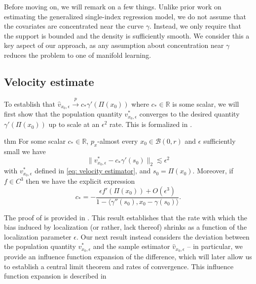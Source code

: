 \documentclass[11pt]{article}
\begin{document}
Before moving on, we will remark on a few things. Unlike prior work on estimating the generalized single-index regression model, we do not assume that the covariates are concentrated near the curve $\gamma$. Instead, we only require that the support is bounded and the density is sufficiently smooth. We consider this a key aspect of our approach, as any assumption about concentration near $\gamma$ reduces the problem to one of manifold learning. 

\subsection{Velocity estimate} \label{sec: velocity results presentation}

To establish that $\hat{v}_{x_0, \epsilon} \overset{p}{\rightarrow} c_*\gamma'(\Pi(x_0))$ where $c_* \in \mathbb{R}$ is some scalar, we will first show that the population quantity $v^*_{x_0, \epsilon}$ converges to the desired quantity $\gamma'(\Pi(x_0))$ up to scale at an $\epsilon^2$ rate. This is formalized in .

\begin{restatable}{thm}{}\label{thm: population prop}
    For some scalar $c_* \in \mathbb{R}$, $p_x$-almost every $x_0 \in \mathcal{B}(0, r)$ and $\epsilon$ sufficiently small we have 
    \[\|v^*_{x_0, \epsilon} - c_*\gamma'(s_0)\|_2 \lesssim \epsilon^2\]
    with $v^*_{x_0, \epsilon}$ defined in \cref{eq: velocity estimator}, and  $s_0 = \Pi(x_0)$. Moreover, if $f \in C^3$ then we have the explicit expression
    \[c_* = -\frac{\epsilon f'(\Pi(x_0))+ O(\epsilon^3)}{1 - \langle \gamma''(s_0), x_0 - \gamma(s_0)\rangle}.\]
\end{restatable}

The proof of  is provided in . This result establishes that the rate with which the bias induced by localization (or rather, lack thereof) shrinks as a function of the localization parameter $\epsilon$. Our next result instead considers the deviation between the population quantity $v^*_{x_0, \epsilon}$ and the sample estimator $\hat v_{x_0, \epsilon}$ -- in particular, we provide an influence function expansion of the difference, which will later allow us to establish a central limit theorem and rates of convergence. This influence function expansion is described in 
\end{document}
